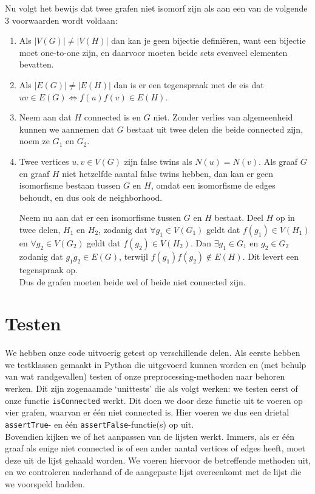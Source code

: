 \documentclass{article}
\begin{document}
Nu volgt het bewijs dat twee grafen niet isomorf zijn als aan een van de volgende 3 voorwaarden wordt voldaan:
\begin{enumerate}
\item Als $|V(G)|\neq|V(H)|$ dan kan je geen bijectie defini\"eren, want een bijectie moet one-to-one zijn, en daarvoor moeten beide sets evenveel elementen bevatten.
\item Als $|E(G)|\neq|E(H)|$ dan is er een tegenspraak met de eis dat $uv\in E(G)\Leftrightarrow f(u)f(v)\in E(H)$.
\item Neem aan dat $H$ connected is en $G$ niet. Zonder verlies van algemeenheid kunnen we aannemen dat $G$ bestaat uit twee delen die beide connected zijn, noem ze $G_1$ en $G_2$.
\item Twee vertices $u, v \in V(G)$ zijn false twins als $N(u)=N(v)$. Als graaf $G$ en graaf $H$ niet hetzelfde aantal false twins hebben, dan kan er geen isomorfisme bestaan tussen $G$ en $H$, omdat een isomorfisme de edges behoudt, en dus ook de neighborhood.

\vspace{5mm}
Neem nu aan dat er een isomorfisme tussen $G$ en $H$ bestaat. Deel $H$ op in twee delen, $H_1$ en $H_2$, zodanig dat $\forall g_1\in V(G_1)$ geldt dat $f(g_1)\in V(H_1)$ en $\forall g_2\in V(G_2)$ geldt dat $f(g_2)\in V(H_2)$.
Dan $\exists g_1\in G_1$ en $g_2\in G_2$ zodanig dat $g_1g_2\in E(G)$, terwijl $f(g_1)f(g_2)\notin E(H)$. Dit levert een tegenspraak op.\\
Dus de grafen moeten beide wel of beide niet connected zijn.
\end{enumerate}

\pagebreak


\section{Testen}
We hebben onze code uitvoerig getest op verschillende delen. Als eerste hebben we testklassen gemaakt in Python die uitgevoerd kunnen worden en (met behulp van wat randgevallen) testen of onze preprocessing-methoden naar behoren werken. Dit zijn zogenaamde `unittests' die als volgt werken: we testen eerst of onze functie \texttt{isConnected} werkt. Dit doen we door deze functie uit te voeren op vier grafen, waarvan er \'e\'en niet connected is. Hier voeren we dus een drietal \texttt{assertTrue}- en \'e\'en \texttt{assertFalse}-functie(s) op uit.\\
Bovendien kijken we of het aanpassen van de lijsten werkt. Immers, als er \'e\'en graaf als enige niet connected is of een ander aantal vertices of edges heeft, moet deze uit de lijst gehaald worden. We voeren hiervoor de betreffende methoden uit, en we controleren naderhand of de aangepaste lijst overeenkomt met de lijst die we voorspeld hadden.\\
\end{document}
